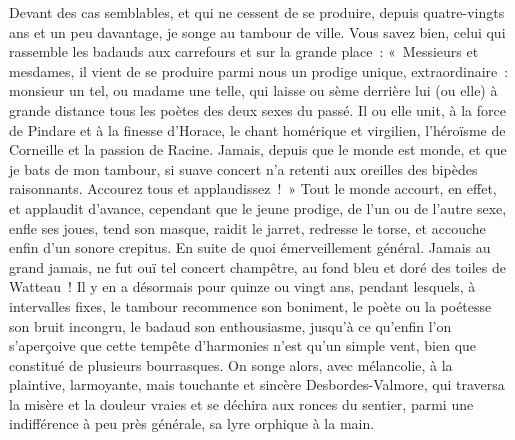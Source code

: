 \documentclass[french,twoside]{book} %
\begin{document}
Devant des cas semblables, et qui ne cessent de se produire, depuis quatre-vingts ans et un peu davantage, je songe au tambour de ville. Vous savez bien, celui qui rassemble les badauds aux carrefours et sur la grande place : « Messieurs et mesdames, il vient de se produire parmi nous un prodige unique, extraordinaire : monsieur un tel, ou madame une telle, qui laisse ou sème derrière lui (ou elle) à grande distance tous les poètes des deux sexes du passé. Il ou elle unit, à la force de Pindare et à la finesse d’Horace, le chant homérique et virgilien, l’héroïsme de Corneille et la passion de Racine. Jamais, depuis que le monde est monde, et que je bats de mon tambour, si suave concert n’a retenti aux oreilles des bipèdes raisonnants. Accourez tous et applaudissez ! » Tout le monde accourt, en effet, et applaudit d’avance, cependant que le jeune prodige, de l’un ou de l’autre sexe, enfle ses joues, tend son masque, raidit le jarret, redresse le torse, et accouche enfin d’un sonore crepitus. En suite de quoi émerveillement général. Jamais au grand jamais, ne fut ouï tel concert champêtre, au fond bleu et doré des toiles de Watteau ! Il y en a désormais pour quinze ou vingt ans, pendant lesquels, à intervalles fixes, le tambour recommence son boniment, le poète ou la poétesse son bruit incongru, le badaud son enthousiasme, jusqu’à ce qu’enfin l’on s’aperçoive que cette tempête d’harmonies n’est qu’un simple vent, bien que constitué de plusieurs bourrasques. On songe alors, avec mélancolie, à la plaintive, larmoyante, mais touchante et sincère Desbordes-Valmore, qui traversa la misère et la douleur vraies et se déchira aux ronces du sentier, parmi une indifférence à peu près générale, sa lyre orphique à la main.\par
\end{document}
